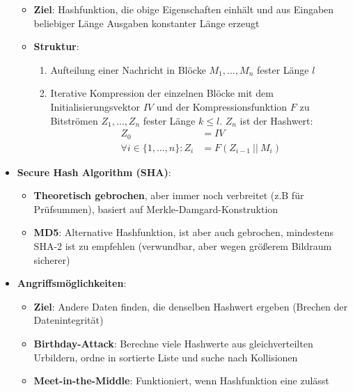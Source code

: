 \begin{itemize}
	\begin{itemize}
		\item \textbf{Ziel}: Hashfunktion, die obige Eigenschaften einhält und aus Eingaben beliebiger Länge Ausgaben konstanter Länge erzeugt
		\item \textbf{Struktur}: 
		\begin{enumerate}
			\item Aufteilung einer Nachricht in Blöcke $M_1, \dots, M_n$ fester Länge $l$
			\item Iterative Kompression der einzelnen Blöcke mit dem Initialisierungsvektor $IV$ und der Kompressionsfunktion $F$ zu Bitströmen $Z_1, \dots, Z_n$ fester Länge $k \leq l$. $Z_n$ ist der Hashwert:
			\begin{align*}
				Z_0 &= IV\\
				\forall i \in \{1, \dots, n\}: Z_i &= F(Z_{i-1}\ ||\ M_i)
			\end{align*}
		\end{enumerate}
	\end{itemize}
	\item \textbf{Secure Hash Algorithm (SHA)}:
	\begin{itemize}
		\item \textbf{Theoretisch gebrochen}, aber immer noch verbreitet (z.B für Prüfsummen), basiert auf Merkle-Damgard-Konstruktion
		\item \textbf{MD5}: Alternative Hashfunktion, ist aber auch gebrochen, mindestens SHA-2 ist zu empfehlen (verwundbar, aber wegen größerem Bildraum sicherer)
	\end{itemize}
	\item \textbf{Angriffsmöglichkeiten}:
	\begin{itemize}
		\item \textbf{Ziel}: Andere Daten finden, die denselben Hashwert ergeben (Brechen der Datenintegrität)
		\item \textbf{Birthday-Attack}: Berechne viele Hashwerte aus gleichverteilten Urbildern, ordne in sortierte Liste und suche nach Kollisionen
		\item \textbf{Meet-in-the-Middle}: Funktioniert, wenn Hashfunktion eine  zulässt
	\end{itemize}
\end{itemize}